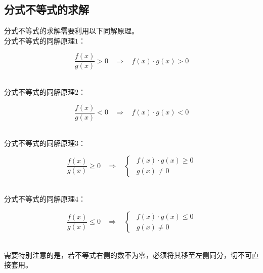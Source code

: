 \documentclass[UTF8]{ctexart}
\begin{document}
\subsection{分式不等式的求解}
    分式不等式的求解需要利用以下同解原理。\\[3mm]
    分式不等式的同解原理$1$：
    \begin{large}
        \begin{equation*}
            \frac{f(x)}{g(x)}>0~~~~\Rightarrow~~~~f(x)\cdot g(x)>0
        \end{equation*}
    \end{large}\\
    分式不等式的同解原理$2$：
    \begin{large}
        \begin{equation*}
            \frac{f(x)}{g(x)}<0~~~~\Rightarrow~~~~f(x)\cdot g(x)<0
        \end{equation*}
    \end{large}\\
    分式不等式的同解原理$3$：
    \begin{large}
        \begin{equation*}
            \frac{f(x)}{g(x)}\geq 0~~~~\Rightarrow~~~~
            \begin{cases}
                ~~f(x)\cdot g(x)\geq 0\\[1mm]
                ~~g(x)\neq 0
            \end{cases}
        \end{equation*}
    \end{large}\\
    分式不等式的同解原理$4$：
    \begin{large}
        \begin{equation*}
            \frac{f(x)}{g(x)}\leq 0~~~~\Rightarrow~~~~
            \begin{cases}
                ~~f(x)\cdot g(x)\leq 0\\[1mm]
                ~~g(x)\neq 0
            \end{cases}
        \end{equation*}
    \end{large}\\
    需要特别注意的是，若不等式右侧的数不为零，必须将其移至左侧同分，切不可直接套用。

\newpage
\end{document}
